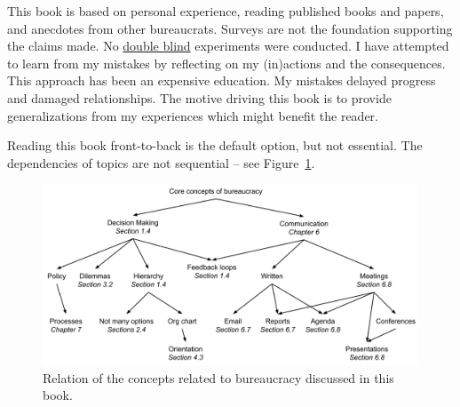 This book is based on personal experience, reading published books and papers, and anecdotes from other bureaucrats. Surveys are not the foundation supporting the claims made. No \href{https://en.wikipedia.org/wiki/Blinded_experiment}{double blind} 
experiments were conducted. 
I have attempted to learn from my mistakes by reflecting on my (in)actions and the consequences. This approach has been an expensive education. My mistakes delayed progress and damaged relationships. The motive driving this book is to provide generalizations from my experiences which might benefit the reader.


Reading this book front-to-back is the default option, but not essential. The dependencies of topics are not sequential -- see Figure~\ref{fig:core-concepts}.

\begin{figure}[ht]
    \centering
    \includegraphics[width=1\textwidth]{images/core_concepts_map.pdf}
    \caption{Relation of the concepts related to bureaucracy discussed in this book. }
    \label{fig:core-concepts}
\end{figure}


